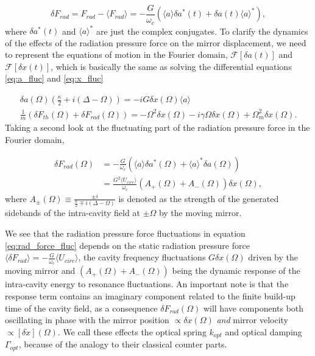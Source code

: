 \begin{equation}
\delta F_{rad} = F_{rad} - \langle F_{rad}\rangle = - \frac{G}{\omega_c}\left( \langle a \rangle \delta a^*(t) + \delta a(t) \langle a \rangle^* \right),
\end{equation}
\noindent
where $\delta a^*(t)$ and $\langle a \rangle^*$ are just the complex conjugates. To clarify the dynamics of the effects of the radiation pressure force on the mirror displacement, we need to represent the equations of motion in the Fourier domain, $\mathcal{F}[\delta a(t)]$ and $\mathcal{F}[\delta x(t)]$, which is basically the same as solving the differential equations \eqref{eq:a_fluc} and \eqref{eq:x_fluc}

\begin{align}
\delta a(\Omega)\left(\frac{\kappa}{2} + i(\Delta - \Omega)\right) = -iG\delta x(\Omega) \langle a \rangle \\
\frac{1}{m}\left( \delta F_{th}(\Omega) + \delta F_{rad}(\Omega) \right) = -\Omega^2\delta x(\Omega) - i\gamma\Omega\delta x(\Omega) + \Omega_m^2\delta x(\Omega).
\end{align}
\noindent
Taking a second look at the fluctuating part of the radiation pressure force in the Fourier domain,

\begin{equation}
\begin{split}
\delta F_{rad}(\Omega) & = -\frac{G}{\omega_c}(\langle a \rangle\delta a^*(\Omega) + \langle a \rangle^*\delta a(\Omega)) \\
 & = \frac{G^2 \langle U_{circ} \rangle}{\omega_c}(A_+(\Omega) + A_-(\Omega))\delta x(\Omega),
 \label{eq:rad_force_fluc}
\end{split}
\end{equation}
\noindent
where $A_{\pm}(\Omega) \equiv \frac{\pm i}{\frac{\kappa}{2} \mp i(\Delta - \Omega)}$ is denoted as the strength of the generated sidebands of the intra-cavity field at $\pm\Omega$ by the moving mirror.

We see that the radiation pressure force fluctuations in equation \eqref{eq:rad_force_fluc} depends on the static radiation pressure force $\langle \delta F_{rad} \rangle = -\frac{G}{\omega_c}\langle U_{circ} \rangle$, the cavity frequency fluctuations $G\delta x(\Omega)$ driven by the moving mirror and $(A_+(\Omega) + A_-(\Omega))$ being the dynamic response of the intra-cavity energy to resonance fluctuations. An important note is that the response term contains an imaginary component related to the finite build-up time of the cavity field, as a consequence  $\delta F_{rad}(\Omega)$ will have components both oscillating in phase with the mirror position $\propto \delta x(\Omega)$ {\it and} mirror velocity $\propto [\delta \dot{x}](\Omega)$. We call these effects the optical spring $k_{opt}$ and optical damping $\Gamma_{opt}$, because of the analogy to their classical counter parts.

